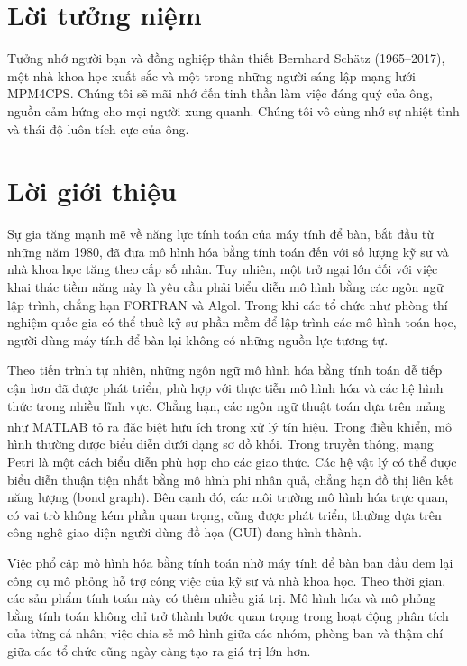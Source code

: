 \chapter*{Lời tưởng niệm}
Tưởng nhớ người bạn và đồng nghiệp thân thiết Bernhard Schätz (1965--2017), một nhà khoa học xuất sắc và một trong những người sáng lập mạng lưới MPM4CPS. Chúng tôi sẽ mãi nhớ đến tinh thần làm việc đáng quý của ông, nguồn cảm hứng cho mọi người xung quanh. Chúng tôi vô cùng nhớ sự nhiệt tình và thái độ luôn tích cực của ông.

\chapter*{Lời giới thiệu}
Sự gia tăng mạnh mẽ về năng lực tính toán của máy tính để bàn, bắt đầu từ những năm 1980, đã đưa mô hình hóa bằng tính toán đến với số lượng kỹ sư và nhà khoa học tăng theo cấp số nhân. Tuy nhiên, một trở ngại lớn đối với việc khai thác tiềm năng này là yêu cầu phải biểu diễn mô hình bằng các ngôn ngữ lập trình, chẳng hạn FORTRAN và Algol. Trong khi các tổ chức như phòng thí nghiệm quốc gia có thể thuê kỹ sư phần mềm để lập trình các mô hình toán học, người dùng máy tính để bàn lại không có những nguồn lực tương tự.

Theo tiến trình tự nhiên, những ngôn ngữ mô hình hóa bằng tính toán dễ tiếp cận hơn đã được phát triển, phù hợp với thực tiễn mô hình hóa và các hệ hình thức trong nhiều lĩnh vực. Chẳng hạn, các ngôn ngữ thuật toán dựa trên mảng như MATLAB\textsuperscript{\textregistered} tỏ ra đặc biệt hữu ích trong xử lý tín hiệu. Trong điều khiển, mô hình thường được biểu diễn dưới dạng sơ đồ khối. Trong truyền thông, mạng Petri là một cách biểu diễn phù hợp cho các giao thức. Các hệ vật lý có thể được biểu diễn thuận tiện nhất bằng mô hình phi nhân quả, chẳng hạn đồ thị liên kết năng lượng (bond graph). Bên cạnh đó, các môi trường mô hình hóa trực quan, có vai trò không kém phần quan trọng, cũng được phát triển, thường dựa trên công nghệ giao diện người dùng đồ họa (GUI) đang hình thành.

Việc phổ cập mô hình hóa bằng tính toán nhờ máy tính để bàn ban đầu đem lại công cụ mô phỏng hỗ trợ công việc của kỹ sư và nhà khoa học. Theo thời gian, các sản phẩm tính toán này có thêm nhiều giá trị. Mô hình hóa và mô phỏng bằng tính toán không chỉ trở thành bước quan trọng trong hoạt động phân tích của từng cá nhân; việc chia sẻ mô hình giữa các nhóm, phòng ban và thậm chí giữa các tổ chức cũng ngày càng tạo ra giá trị lớn hơn.

